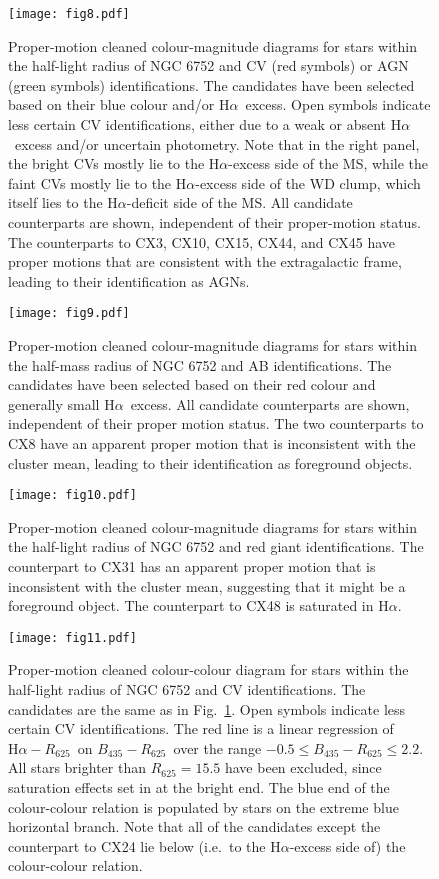 \documentclass[fleqn,usenatbib]{mnras}
\newcommand{\B}{\mbox{$B_{435}$}}
\newcommand{\R}{\mbox{$R_{625}$}}
\newcommand{\br}{\mbox{$\B\!-\!\R$}}
\newcommand{\ha}{\mbox{H$\alpha$}}
\newcommand{\hr}{\mbox{$\ha\!-\!\R$}}
\begin{document}
\begin{figure}
\texttt{[image: fig8.pdf]}
%
\caption{Proper-motion cleaned colour-magnitude diagrams for stars within the half-light radius of NGC 6752 and CV (red symbols) or AGN (green symbols) identifications. The candidates have been selected based on their blue colour and/or \ha\ excess. Open symbols indicate less certain CV identifications, either due to a weak or absent \ha\ excess and/or uncertain photometry. Note that in the right panel, the bright CVs mostly lie to the \ha-excess side of the MS, while the faint CVs mostly lie to the \ha-excess side of the WD clump, which itself lies to the \ha-deficit side of the MS. All candidate counterparts are shown, independent of their proper-motion status. The counterparts to CX3, CX10, CX15, CX44, and CX45 have proper motions that are consistent with the extragalactic frame, leading to their identification as AGNs. 
%
\label{f:CMD_CV}}
\end{figure}

\begin{figure}
\texttt{[image: fig9.pdf]}
%
\caption{Proper-motion cleaned colour-magnitude diagrams for stars within the half-mass radius of NGC 6752 and AB identifications.  The candidates have been selected based on their red colour and generally small \ha\ excess. All candidate counterparts are shown, independent of their proper motion status. The two counterparts to CX8 have an apparent proper motion that is inconsistent with the cluster mean, leading to their identification as foreground objects. 
%
\label{f:CMD_AB}}
\end{figure}

\begin{figure}
\texttt{[image: fig10.pdf]}
%
\caption{Proper-motion cleaned colour-magnitude diagrams for stars within the half-light radius of NGC 6752 and red giant identifications. The counterpart to CX31 has an apparent proper motion that is inconsistent with the cluster mean, suggesting that it might be a foreground object. The counterpart to CX48 is saturated in \ha. 
\label{f:CMD_RG}}
\end{figure}

\begin{figure}
\texttt{[image: fig11.pdf]}
%
\caption{Proper-motion cleaned colour-colour diagram for stars within the half-light radius of NGC 6752 and CV identifications.  The candidates are the same as in Fig.~\ref{f:CMD_CV}.  Open symbols indicate less certain CV identifications.  The red line is a linear regression of \hr\ on \br\ over the range $-0.5 \le \br \le 2.2$. All stars brighter than $\R = 15.5$ have been excluded, since saturation effects set in at the bright end.  The blue end of the colour-colour relation is populated by stars on the extreme blue horizontal branch. Note that all of the candidates except the counterpart to CX24 lie below (i.e.\ to the \ha-excess side of) the colour-colour relation.  
\label{f:CCD_CV}}
\end{figure}
\end{document}
